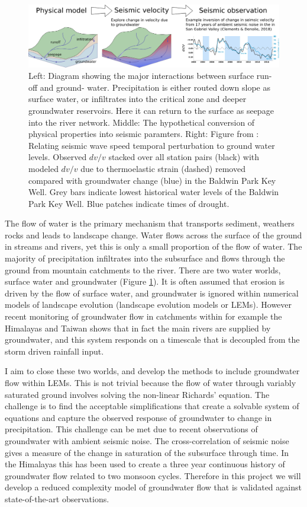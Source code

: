 \begin{figure}
    \centering
    \includegraphics[width=\textwidth]{./figures/groundwater.png}
    \caption{Left: Diagram showing the major interactions between surface run-off and ground-
water. Precipitation is either routed down slope as surface water, or infiltrates into the
critical zone and deeper groundwater reservoirs. Here it can return to the surface as seepage
into the river network. Middle: The hypothetical conversion of physical properties into seismic paramters. Right: Figure from \cite{clements-2018}: Relating seismic wave speed temporal perturbation to ground water levels. Observed $dv/v$ stacked over all station pairs (black) with modeled $dv/v$ due to thermoelastic strain (dashed) removed compared with groundwater change (blue) in the Baldwin Park Key Well. Grey bars indicate lowest historical water levels of the Baldwin Park Key Well. Blue patches indicate times of drought.}
    \label{fg:groundwater}
\end{figure}

The flow of water is the primary mechanism that transports sediment, weathers rocks and leads to landscape change. Water flows across the surface of the ground in streams and rivers, yet this is only a small proportion of the flow of water. The majority of precipitation infiltrates into the subsurface and flows through the ground from mountain catchments to the river. There are two water worlds, surface water and groundwater (Figure \ref{fg:groundwater}). It is often assumed that erosion is driven by the flow of surface water, and groundwater is ignored within numerical models of landscape evolution (landscape evolution models or LEMs). However recent monitoring of groundwater flow in catchments within for example the Himalayas and Taiwan shows that in fact the main rivers are supplied by groundwater, and this system responds on a timescale that is decoupled from the storm driven rainfall input.

I aim to close these two worlds, and develop the methods to include groundwater flow within LEMs. This is not trivial because the flow of water through variably saturated ground involves solving the non-linear Richards' equation. The challenge is to find the acceptable simplifications that create a solvable system of equations and capture the observed response of groundwater to change in precipitation. This challenge can be met due to recent observations of groundwater with ambient seismic noise. The cross-correlation of seismic noise gives a measure of the change in saturation of the subsurface through time. In the Himalayas this has been used to create a three year continuous history of groundwater flow related to two monsoon cycles. Therefore in this project we will develop a reduced complexity model of groundwater flow that is validated against state-of-the-art observations.

